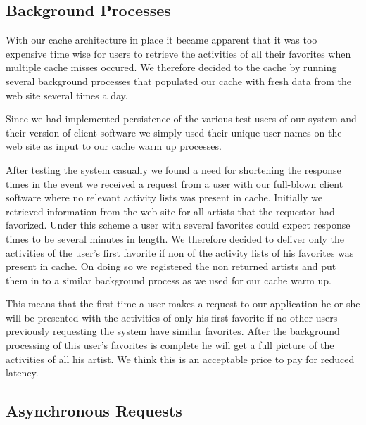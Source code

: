 \subsection{Background Processes}
\label{section:implementation.architecture.background.process}

With our cache architecture in place it became apparent that it was too
expensive time wise for users to retrieve the activities of all their
favorites when multiple cache misses occured. We therefore decided to
 the cache by running several background processes that populated
our cache with fresh data from the \urort{} web site several times a day.

Since we had implemented persistence of the various test users of our system
and their version of client software we simply used their unique user names
on the \urort{} web site as input to our cache warm up processes.

After testing the system casually we found a need for shortening the response
times in the event we received a request from a user with our full-blown
client software where no relevant activity lists
was present in cache. Initially we retrieved information from the \urort{} web
site for all artists that the requestor had favorized. Under this scheme a
user with several favorites could expect response times to be several minutes
in length. We therefore decided to deliver only the activities of the user's
first favorite if non of the activity lists of his favorites was present in
cache. On doing so we registered the non returned artists and put them in to a
similar background process as we used for our cache warm up. 

This means that the first time a user makes a request to our application he
or she will be presented with the activities of only his first favorite if no
other users previously requesting the system have similar favorites. After the
background processing of this user's favorites is complete he will get a full
picture of the activities of all his artist. We think this is an acceptable
price to pay for reduced latency.

\subsection{Asynchronous Requests}

